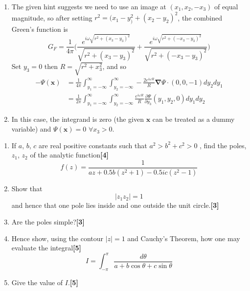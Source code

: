 \documentclass[a4paper]{article}
\begin{document}
\begin{ans}
\begin{enumerate}[label=(\roman*)]
\item The given hint suggests we need to use an image at $(x_1,x_2,-x_3)$ of equal magnitude, so after setting $r^2=(x_1-y_)^2+(x_2-y_2)^2$, the combined Green's function is
$$G_F=\frac{1}{4\pi}\bigg(\frac{e^{i\omega\sqrt{r^2+(x_3-y_3)^2}}}{\sqrt{r^2+(x_3-y_3)^2}}+\frac{e^{i\omega\sqrt{r^2+(-x_3-y_3)^2}}}{\sqrt{r^2+(-x_3-y_3)^2}}\bigg)$$
Set $y_3=0$ then $R=\sqrt{r^2+x_3^2}$, and so 
\begin{align}
-\Psi(\mathbf{x})&=\frac{1}{4\pi}\int_{y_1=-\infty}^\infty\int_{y_2=-\infty}^\infty -\frac{2e^{i\omega R}}{R}\boldsymbol{\nabla}\Psi\cdot (0,0,-1)dy_2dy_1\nonumber\\&=\frac{1}{2\pi}\int_{y_1=-\infty}^\infty\int_{y_2=-\infty}^\infty\frac{e^{i\omega R}}{R}\frac{\partial\Psi}{\partial y_3}(y_1,y_2,0)dy_1dy_2\nonumber
\end{align}
\item In this case, the integrand is zero (the given $\mathbf{x}$ can be treated as a dummy variable) and $\Psi(\mathbf{x})=0$ $\forall x_3>0$.
\end{enumerate}
\end{ans}
\newpage
\begin{qns}\leavevmode
\begin{enumerate}[label=(\roman*)]
    \item If $a$, $b$, $c$ are real positive constants such that $a^2 > b^2 + c^2 > 0$ , find the poles, $z_1$, $z_2$ of the analytic function\hfill\textbf{[4]}
$$f(z)=\frac{1}{az+0.5b(z^2+1)-0.5ic(z^2-1)}$$
\item Show that $$|z_1z_2|=1$$
and hence that one pole lies inside and one outside the unit circle.\hfill\textbf{[3]}
\item Are the poles simple?\hfill\textbf{[3]}
\item Hence show, using the contour $|z| = 1$ and Cauchy’s Theorem, how one may evaluate the integral\hfill\textbf{[5]}
$$I=\int_{-\pi}^\pi\frac{d\theta}{a+b\cos\theta+c\sin\theta}$$
\item Give the value of $I$.\hfill\textbf{[5]}
\end{enumerate}
\end{qns}
\end{document}
